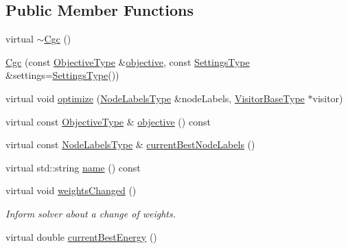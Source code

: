 \subsection*{Public Member Functions}
\begin{DoxyCompactItemize}
\item 
virtual \hyperlink{classnifty_1_1graph_1_1opt_1_1multicut_1_1Cgc_aa3f06e4557d83941c8278b14225185cb}{$\sim$\+Cgc} ()
\item 
\hyperlink{classnifty_1_1graph_1_1opt_1_1multicut_1_1Cgc_a5cd8c7c9c72d94cde40b57be5b167066}{Cgc} (const \hyperlink{classnifty_1_1graph_1_1opt_1_1multicut_1_1Cgc_aa83ae7cd167c0580c61f1d4eab63eb9a}{Objective\+Type} \&\hyperlink{classnifty_1_1graph_1_1opt_1_1multicut_1_1Cgc_a3516566160ba18067f1a81dfa6aee33e}{objective}, const \hyperlink{structnifty_1_1graph_1_1opt_1_1multicut_1_1Cgc_1_1SettingsType}{Settings\+Type} \&settings=\hyperlink{structnifty_1_1graph_1_1opt_1_1multicut_1_1Cgc_1_1SettingsType}{Settings\+Type}())
\item 
virtual void \hyperlink{classnifty_1_1graph_1_1opt_1_1multicut_1_1Cgc_a56de905a25ea793359e267360238d0e4}{optimize} (\hyperlink{classnifty_1_1graph_1_1opt_1_1multicut_1_1Cgc_a19f52bf3f00bed2816bd44604b94e7af}{Node\+Labels\+Type} \&node\+Labels, \hyperlink{classnifty_1_1graph_1_1opt_1_1multicut_1_1Cgc_a6d429c6a15de0e6fb98c94ad4fec14f0}{Visitor\+Base\+Type} $\ast$visitor)
\item 
virtual const \hyperlink{classnifty_1_1graph_1_1opt_1_1multicut_1_1Cgc_aa83ae7cd167c0580c61f1d4eab63eb9a}{Objective\+Type} \& \hyperlink{classnifty_1_1graph_1_1opt_1_1multicut_1_1Cgc_a3516566160ba18067f1a81dfa6aee33e}{objective} () const
\item 
virtual const \hyperlink{classnifty_1_1graph_1_1opt_1_1multicut_1_1Cgc_a19f52bf3f00bed2816bd44604b94e7af}{Node\+Labels\+Type} \& \hyperlink{classnifty_1_1graph_1_1opt_1_1multicut_1_1Cgc_a1280ab4b4cacaf7205c7d33951931460}{current\+Best\+Node\+Labels} ()
\item 
virtual std\+::string \hyperlink{classnifty_1_1graph_1_1opt_1_1multicut_1_1Cgc_a1c7194ad33e321f737b2ca33decd33f8}{name} () const
\item 
virtual void \hyperlink{classnifty_1_1graph_1_1opt_1_1multicut_1_1Cgc_aff65d0bc2f7537bf328c47979a3293d5}{weights\+Changed} ()
\begin{DoxyCompactList}\small\item\em Inform solver about a change of weights. \end{DoxyCompactList}\item 
virtual double \hyperlink{classnifty_1_1graph_1_1opt_1_1multicut_1_1Cgc_adecdb401bca97a45d76a162fc7c8df37}{current\+Best\+Energy} ()
\end{DoxyCompactItemize}


